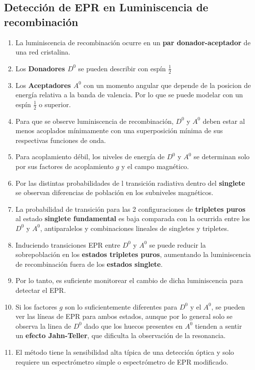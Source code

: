 \documentclass[aps,rmp,reprint,longbibliography]{revtex4-1}
\begin{document}
\subsection{Detección de EPR en Luminiscencia de recombinación}
\begin{enumerate}
\item La luminiscencia de recombinación ocurre en un \textbf{par donador-aceptador} de una red cristalina. 
\item Los \textbf{Donadores $D^0$} se pueden describir con espín $\frac{1}{2}$ 
\item Los \textbf{Aceptadores $A^0$} con un momento angular que depende de la posicion de energía relativa a la banda de valencia. Por lo que se puede modelar con un espín $\frac{1}{2}$ o superior.
\item Para que se observe luminiscencia de recombinación, $D^0$ y $A^0$ deben estar al menos acoplados mínimamente con una superposición mínima de sus respectivas funciones de onda. 
\item Para acoplamiento débil, los niveles de energía de $D^0$ y $A^0$ se determinan solo por sus factores de acoplamiento $g$ y el campo magnético.
\item Por las distintas probabilidades de l transición radiativa dentro del \textbf{singlete} se observan diferencias de población en los subniveles magnéticos.
\item La probabilidad de transición para las 2 configuraciones de \textbf{tripletes puros} al estado \textbf{singlete fundamental} es baja comparada con la ocurrida entre los $D^0$ y $A^0$, antiparalelos y combinaciones lineales de singletes y tripletes. 
\item Induciendo transiciones EPR entre $D^0$ y $A^0$ se puede reducir la sobrepoblación en los \textbf{estados tripletes puros}, aumentando la luminiscencia de recombinación fuera de los \textbf{estados singlete}. 
\item Por lo tanto, es suficiente monitorear el cambio de dicha luminiscencia para detectar el EPR.
\item Si los factores $g$ son lo suficientemente diferentes para $D^0$ y el $A^0$, se pueden ver las líneas de EPR para ambos estados, aunque por lo general solo se observa la linea de $D^0$ dado que los huecos presentes en $A^0$ tienden a sentir un \textbf{efecto Jahn-Teller}, que dificulta la observación de la resonancia. 
\item El método tiene la sensibilidad alta típica de una detección óptica y solo requiere un espectrómetro simple o espectrómetro de EPR modificado. 
\end{enumerate}
\end{document}
